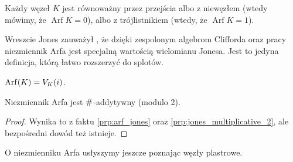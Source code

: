 \begin{definition}[Kauffman, 1983]
    Każdy węzeł $K$ jest równoważny przez przejścia albo z niewęzłem (wtedy mówimy, że $\operatorname{Arf} K = 0$), albo z trójlistnikiem (wtedy, że $\operatorname{Arf} K = 1$).
\end{definition}

Wreszcie Jones zauważył \cite[tw. 19]{jones85}, że dzięki zespolonym algebrom Clifforda oraz pracy \cite{lannes85} niezmiennik Arfa jest specjalną wartością wielomianu Jonesa.
Jest to jedyna definicja, którą łatwo rozszerzyć do splotów.

\begin{proposition}[Jones, 1985]
\label{prp:arf_jones}%
    $\operatorname{Arf}(K) = V_K(i)$.
\end{proposition}

\begin{corollary}
    Niezmiennik Arfa jest $\mathbin{\#}$-addytywny (modulo 2).
\end{corollary}

\begin{proof}
    Wynika to z faktu \ref{prp:arf_jones} oraz \ref{prp:jones_multiplicative_2}, ale bezpośredni dowód też istnieje. %
\end{proof}

O niezmienniku Arfa usłyszymy jeszcze poznając węzły plastrowe.




